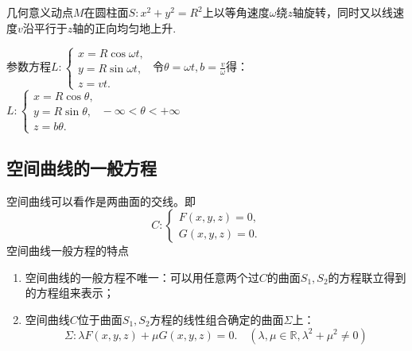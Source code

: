 \newpage
\example[圆柱螺旋线的参数方程]
{\color{dy}几何意义}\quad 动点$M$在圆柱面$S:x^2+y^2=R^2$上以等角速度$\omega $绕$z$轴旋转，同时又以线速度$v$沿平行于$z$轴的正向均匀地上升.
\par {\color{dy}参数方程}\quad $\displaystyle L:\begin{cases}
x=R\cos \omega t,\\
y=R\sin \omega t,\\
z=vt.
\end{cases}$
令$\displaystyle \theta =\omega t,b=\frac{v}{\omega}$得：
$\displaystyle L:\begin{cases}
x=R\cos \theta ,\\
y=R\sin \theta,\\
z=b\theta .
\end{cases}\, -\infty  < \theta  < +\infty $

\subsection{空间曲线的一般方程}
\tdefination[空间曲线的一般方程]
空间曲线可以看作是两曲面的交线。即
\begin{equation}
C:
\begin{cases}
F(x,y,z)=0,\\
G(x,y,z)=0.
\end{cases}
\end{equation}
{\color{dy}空间曲线一般方程的特点}
\begin{enumerate}[1.]
	\setlength{\itemindent}{2em}
	\setlength{\topsep}{0.01em}
	\setlength{\itemsep}{0.01em}
	\item 空间曲线的一般方程不唯一：可以用任意两个过$C$的曲面$S_1,S_2$的方程联立得到的方程组来表示；
	\item 空间曲线$C$位于曲面$S_1,S_2$方程的线性组合确定的曲面$\Sigma $上：
	\begin{equation}
	\Sigma :\lambda F(x,y,z)+\mu G(x,y,z)=0.\quad (\lambda ,\mu \in \mathbb{R},\lambda^2+\mu^2 \ne 0)
	\end{equation}
\end{enumerate}

